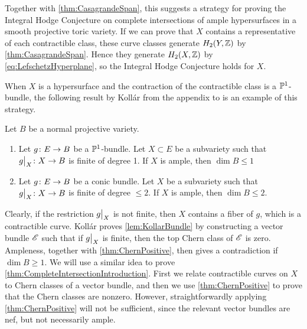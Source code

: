 Together with \cref{thm:CasagrandeSpan}, this suggests a strategy for proving the Integral Hodge Conjecture on complete intersections of ample hypersurfaces in a smooth projective toric variety. If we can prove that $X$ contains a representative of each contractible class, these curve classes generate $H_2(Y,\Z)$ by \cref{thm:CasagrandeSpan}. Hence they generate $H_2(X,\Z)$ by \eqref{eq:LefschetzHyperplane}, so the Integral Hodge Conjecture holds for $X$.

When $X$ is a hypersurface and the contraction of the contractible class is a $\P^1$-bundle, the following result by Koll\'ar from the appendix to \cite{Bor91} is an example of this strategy. 
\begin{lemma}
	\label{lem:KollarBundle}
	Let $B$ be a normal projective variety.
	\begin{enumerate}[label = \emph{(\roman*)}]
		\item Let $g \from E \to B$ be a $\P^1$-bundle. Let $X \subset E$ be a subvariety such that $\restr{g}{X} \from X \to B$ is finite of degree 1. If $X$ is ample, then $\dim B \leq 1$
		
		\item Let $g \from E \to B$ be a conic bundle. Let $X$ be a subvariety such that $\restr{g}{X} \from X \to B$ is finite of degree $\leq 2$. If $X$ is ample, then $\dim B \leq 2$.
\end{enumerate}
\end{lemma}

Clearly, if the restriction $\restr{g}{X}$ is not finite, then $X$ contains a fiber of $g$, which is a contractible curve. Koll\'ar proves \cref{lem:KollarBundle} by constructing a vector bundle $\sE$ such that if $\restr{g}{X}$ is finite, then the top Chern class of $\sE$ is zero. Ampleness, together with \cref{thm:ChernPositive}, then gives a contradiction if $\dim B \geq 1$. We will use a similar idea to prove \cref{thm:CompleteIntersectionIntroduction}. First we relate contractible curves on $X$ to Chern classes of a vector bundle, and then we use \cref{thm:ChernPositive} to prove that the Chern classes are nonzero. However, straightforwardly applying \cref{thm:ChernPositive} will not be sufficient, since the relevant vector bundles are  nef, but not necessarily ample.
      
